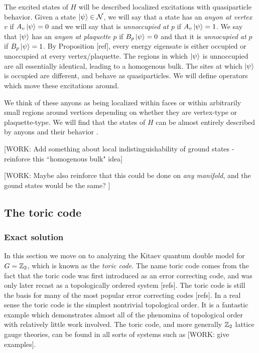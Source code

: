 \documentclass{article}
\theoremstyle{definition}
\numberwithin{figure}{section}
\begin{document}
The excited states of $H$ will be described localized excitations with quasiparticle behavior. Given a state $\ket{\psi}\in \mathcal{N}$, we will say that a state has an \textit{anyon at vertex $v$} if $A_v\ket{\psi}=0$ and we will say that is \textit{unnoccupied at $p$} if $A_v\ket{\psi}=1$. We say that $\ket{\psi}$ has an \textit{anyon at plaquette $p$} if $B_p\ket{\psi}=0$ and that it is \textit{unnocupied at $p$} if $B_p\ket{\psi}=1$. By Proposition [ref], every energy eigensate is either occupied or unoccupied at every vertex/plaquette. The regions in which $\ket{\psi}$ is unnoccupied are all essentially identical, leading to a homogenous bulk. The sites at which $\ket{\psi}$ is occupied are different, and behave as quasiparticles. We will define operators which move these excitations around.

We think of these anyons as being localized within faces or within arbitrarily small regions around vertices depending on whether they are vertex-type or plaquette-type. We will find that the states of $H$ can be almost entirely described by anyons and their behavior .

[WORK: Add something about local indistinguishability of ground states - reinforce this ``homogenous bulk" idea]

[WORK: Maybe also reinforce that this could be done on \textit{any manifold}, and the gound states would be the same? ]

\subsection{The toric code}

\subsubsection{Exact solution}

In this section we move on to analyzing the Kitaev quantum double model for $G=\mathbb{Z}_2$, which is known as the \textit{toric code}. The name toric code comes from the fact that the toric code was first introduced as an error correcting code, and was only later recast as a topologically ordered system [refs]. The toric code is still the basis for many of the most popular error correcting codes [refs]. In a real sense the toric code is the simplest nontrivial topological order. It is a fantastic example which demonstrates almost all of the phenomina of topological order with relatively little work involved. The toric code, and more generally $\mathbb{Z}_2$ lattice gauge theories, can be found in all sorts of systems such as [WORK: give examples]. 
\end{document}
